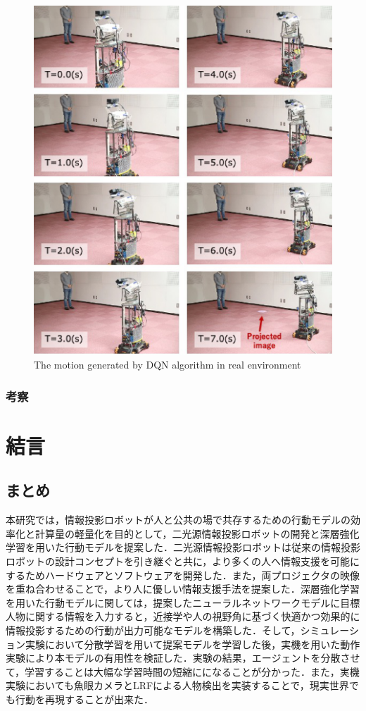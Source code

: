 \documentclass[12pt]{sonota/aislab}
\begin{document}
\begin{figure}[t]
\begin{center}
\includegraphics[clip, width=13cm]{figs/real_experiment_motion.eps}
\caption{The motion generated by DQN algorithm in real environment}
\label{real_experiment_motion}
\end{center}
\end{figure}

\subsection{考察}

\chapter{結言}
\section{まとめ}
本研究では，情報投影ロボットが人と公共の場で共存するための行動モデルの効率化と計算量の軽量化を目的として，二光源情報投影ロボットの開発と深層強化学習を用いた行動モデルを提案した．二光源情報投影ロボットは従来の情報投影ロボットの設計コンセプトを引き継ぐと共に，より多くの人へ情報支援を可能にするためハードウェアとソフトウェアを開発した．また，両プロジェクタの映像を重ね合わせることで，より人に優しい情報支援手法を提案した．深層強化学習を用いた行動モデルに関しては，提案したニューラルネットワークモデルに目標人物に関する情報を入力すると，近接学や人の視野角に基づく快適かつ効果的に情報投影するための行動が出力可能なモデルを構築した．そして，シミュレーション実験において分散学習を用いて提案モデルを学習した後，実機を用いた動作実験により本モデルの有用性を検証した．実験の結果，エージェントを分散させて，学習することは大幅な学習時間の短縮にになることが分かった．また，実機実験においても魚眼カメラとLRFによる人物検出を実装することで，現実世界でも行動を再現することが出来た．
\end{document}
